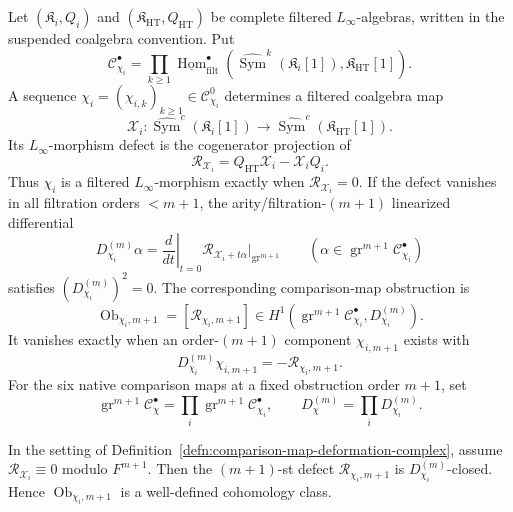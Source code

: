 \begin{defn}
\label{defn:comparison-map-deformation-complex}
Let \((\mathfrak K_i,Q_i)\) and
\((\mathfrak K_{\mathrm{HT}},Q_{\mathrm{HT}})\) be complete filtered
\(L_\infty\)-algebras, written in the suspended coalgebra convention.
Put
\[
  \mathcal C^\bullet_{\chi_i}
  =
  \prod_{k\ge1}
  \underline{\operatorname{Hom}}^{\bullet}_{\mathrm{filt}}
  \left(
    \widehat{\operatorname{Sym}}^k(\mathfrak K_i[1]),
    \mathfrak K_{\mathrm{HT}}[1]\right).
\]
A sequence
\(\chi_i=(\chi_{i,k})_{k\ge1}\in\mathcal C^0_{\chi_i}\) determines a
filtered coalgebra map
\[
  \mathcal X_i\colon
  \widehat{\operatorname{Sym}}^c(\mathfrak K_i[1])
  \longrightarrow
  \widehat{\operatorname{Sym}}^c(\mathfrak K_{\mathrm{HT}}[1]).
\]
Its \(L_\infty\)-morphism defect is the cogenerator projection of
\[
  \mathcal R_{\mathcal X_i}
  =
  Q_{\mathrm{HT}}\mathcal X_i-\mathcal X_iQ_i .
\]
Thus \(\chi_i\) is a filtered \(L_\infty\)-morphism exactly when
\(\mathcal R_{\mathcal X_i}=0\).  If the defect vanishes in all filtration
orders \(<m+1\), the arity/filtration-\((m+1)\) linearized differential
\[
  D^{(m)}_{\chi_i}\alpha
  =
  \left.
  \frac{d}{dt}\right|_{t=0}
  \mathcal R_{\mathcal X_i+t\alpha}\big|_{\operatorname{gr}^{m+1}}
  \qquad
  \left(
    \alpha\in
    \operatorname{gr}^{m+1}\mathcal C^\bullet_{\chi_i}
  \right)
\]
satisfies \((D^{(m)}_{\chi_i})^2=0\).  The corresponding comparison-map
obstruction is
\[
  \operatorname{Ob}_{\chi_i,m+1}
  =
  [\mathcal R_{\chi_i,m+1}]
  \in
  H^1\!\left(
    \operatorname{gr}^{m+1}\mathcal C^\bullet_{\chi_i},
    D^{(m)}_{\chi_i}\right).
\]
It vanishes exactly when an order-\((m+1)\) component
\(\chi_{i,m+1}\) exists with
\[
  D^{(m)}_{\chi_i}\chi_{i,m+1}
  =
  -\mathcal R_{\chi_i,m+1}.
\]
For the six native comparison maps at a fixed obstruction order \(m+1\),
set
\[
  \operatorname{gr}^{m+1}\mathcal C^\bullet_{\chi}
  =
  \prod_i\operatorname{gr}^{m+1}\mathcal C^\bullet_{\chi_i},
  \qquad
  D^{(m)}_\chi=\prod_iD^{(m)}_{\chi_i}.
\]
\end{defn}

\begin{lem}
\label{lem:comparison-map-defect-cocycle}
In the setting of
Definition~\ref{defn:comparison-map-deformation-complex}, assume
\(\mathcal R_{\mathcal X_i}\equiv0\) modulo \(F^{m+1}\).  Then the
\((m+1)\)-st defect \(\mathcal R_{\chi_i,m+1}\) is
\(D^{(m)}_{\chi_i}\)-closed.  Hence
\(\operatorname{Ob}_{\chi_i,m+1}\) is a well-defined cohomology class.
\end{lem}


